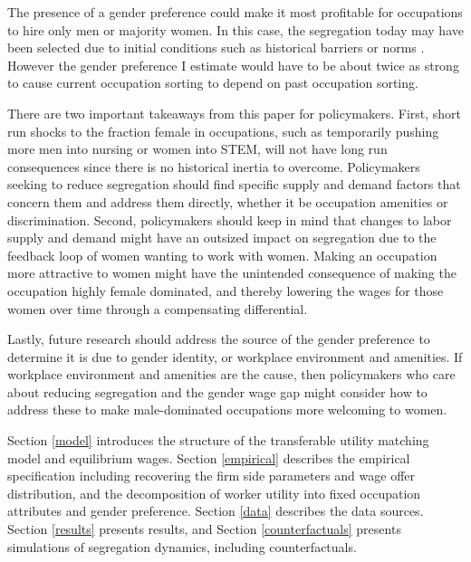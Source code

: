 \documentclass[12pt]{article}
\begin{document}
The presence of a gender preference could make it most profitable for occupations to hire only men or majority women. In this case, the segregation today may have been selected due to initial conditions such as historical barriers or norms \cite{Schelling1971, Pan2010}. However the gender preference I estimate would have to be about twice as strong to cause current occupation sorting to depend on past occupation sorting. 

There are two important takeaways from this paper for policymakers. First, short run shocks to the fraction female in occupations, such as temporarily pushing more men into nursing or women into STEM, will not have long run consequences since there is no historical inertia to overcome. Policymakers seeking to reduce segregation should find specific supply and demand factors that concern them and address them directly, whether it be occupation amenities or discrimination. Second, policymakers should keep in mind that changes to labor supply and demand might have an outsized impact on segregation due to the feedback loop of women wanting to work with women. Making an occupation more attractive to women might have the unintended consequence of making the occupation highly female dominated, and thereby lowering the wages for those women over time through a compensating differential. 

Lastly, future research should address the source of the gender preference to determine it is due to gender identity, or workplace environment and amenities. If workplace environment and amenities are the cause, then policymakers who care about reducing segregation and the gender wage gap might consider how to address these to make male-dominated occupations more welcoming to women.


 
Section \ref{model} introduces the structure of the transferable utility matching model and equilibrium wages. Section \ref{empirical} describes the empirical specification including recovering the firm side parameters and wage offer distribution, and the decomposition of worker utility into fixed occupation attributes and gender preference. Section \ref{data} describes the data sources. Section \ref{results} presents results, and Section \ref{counterfactuals} presents simulations of segregation dynamics, including counterfactuals.
\end{document}
